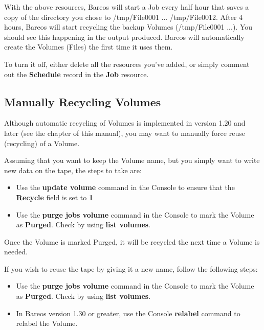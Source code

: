 With the above resources, Bareos will start a Job every half hour that saves a
copy of the directory you chose to /tmp/File0001 ... /tmp/File0012. After 4
hours, Bareos will start recycling the backup Volumes (/tmp/File0001 ...). You
should see this happening in the output produced. Bareos will automatically
create the Volumes (Files) the first time it uses them.

To turn it off, either delete all the resources you've added, or simply
comment out the {\bf Schedule} record in the {\bf Job} resource.

\subsection{Manually Recycling Volumes}
\label{manualrecycling}


Although automatic recycling of Volumes is implemented in version 1.20 and
later (see the
 chapter of
this manual), you may want to manually force reuse (recycling) of a Volume.

Assuming that you want to keep the Volume name, but you simply want to write
new data on the tape, the steps to take are:

\begin{itemize}
\item Use the {\bf update volume} command in the Console to  ensure that the
   {\bf Recycle} field is set to {\bf 1}
\item Use the {\bf purge jobs volume} command in the Console  to mark the
   Volume as {\bf Purged}. Check by using  {\bf list volumes}.
\end{itemize}

Once the Volume is marked Purged, it will be recycled the next time a Volume
is needed.

If you wish to reuse the tape by giving it a new name, follow the following
steps:

\begin{itemize}
\item Use the {\bf purge jobs volume} command in the Console  to mark the
   Volume as {\bf Purged}. Check by using  {\bf list volumes}.
\item In Bareos version 1.30 or greater, use the Console  {\bf relabel}
   command to relabel the Volume.
\end{itemize}

